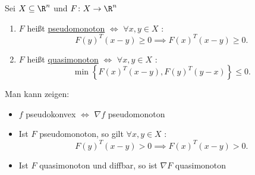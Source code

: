 \begin{folgerung}
\label{thm:monotonefunktionenkonvexefunktionenfolgerung}
\end{folgerung}

\begin{definition}
\label{thm:pseudoquasimonoton}
	Sei $X \subseteq \R^{n}$ und $F \colon X \rightarrow \R^{n} $
	\begin{enumerate}[label=(\alph{enumi})]
		\item  $F$ heißt \underline{pseudomonoton} $\iff$ $\forall x,y \in X$ : 
			\[
				F(y)^{T}(x-y) \geq 0 \implies F(x)^{T}(x-y) \geq 0
			.\] 
		\item $F$ heißt \underline{quasimonoton} $\iff$ $\forall x,y \in X$ :
			\[
				\min \left\{ F(x)^{T}(x-y), F(y)^{T}(y-x) \right\} \leq 0
			.\] 
	\end{enumerate}

	Man kann zeigen:
	\begin{itemize}
		\item $f$ pseudokonvex $\iff$ $\nabla f$ pseudomonoton
		\item Ist $F$ pseudomonoton, so gilt $\forall x,y \in X$ :
			\[
				F(y)^{T} (x-y) > 0 \implies F(x)^{T} (x-y) > 0
			.\] 
		\item Ist $F$ quasimonoton und diffbar, so ist $\nabla F$ quasimonoton
	\end{itemize}
	
\end{definition}
